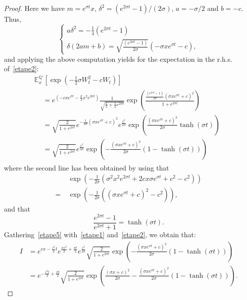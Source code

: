 \documentclass[10pt]{amsart}
\theoremstyle{definition}\newtheorem{defi}[theo]{Definition}\newtheorem{rema}[theo]{Remark}\newtheorem{exam}[theo]{Example}\newtheorem{exem}[theo]{Example}\newtheorem{nota}[theo]{Notation}
\newcommand*\E{\mathbb{E}}
\newcommand{\bbQ}{\mathbb{Q}}
\begin{document}
\begin{proof}
Here we have $m=e^{\sigma t}x$, $\delta^2=(e^{2\sigma t}-1)/(2\sigma)$, $a=-\sigma/2$ and $b=-c$. Thus,
\[
\begin{cases}
a\delta^2=-\frac{1}{4}\left(e^{2\sigma t}-1 \right)\\
\delta(2am+b)=\sqrt{\frac{\left(e^{2\sigma t}-1\right)}{2\sigma}}\left(-\sigma x e^{\sigma t}-c \right),
\end{cases}
\]
and applying the above computation yields for the expectation in the r.h.s. of~\eqref{etape2}:
\begin{multline}\label{etape5}
\E_{x}^{\bbQ'}\left[\exp\left(-\frac{1}{2}\sigma W_{t}^2-c W_{t} \right) \right]\\
\begin{aligned}
&= e^{\left(-cxe^{\sigma t}-\frac{\sigma}{2}x^2e^{2\sigma t}\right)}\frac{1}{\sqrt{\frac{1}{2}+\frac{1}{2}e^{2\sigma t}}}\exp\left(\frac{\frac{\left(e^{2\sigma t}-1\right)}{2\sigma}\left(\sigma x e^{\sigma t}+c \right)^2}{1+e^{2\sigma t}} \right)\\
 &= \sqrt{\frac{2}{1+e^{2\sigma t}}} e^{-\frac{1}{2\sigma} \left(\sigma x e^{\sigma t}+c\right)^2 } e^{\frac{c^2}{2\sigma}}\exp\left(\frac{\left(\sigma x e^{\sigma t}+c\right)^2}{2\sigma}\tanh\left(\sigma t\right)\right)\\
& = \sqrt{\frac{2}{1+e^{2\sigma t}}} e^{\frac{c^2}{2\sigma}}\exp\left(-\frac{\left(\sigma x e^{\sigma t}+c\right)^2}{2\sigma}\left(1-\tanh(\sigma t)\right)\right)
\end{aligned}
\end{multline}
where the second line has been obtained by using that
\begin{align*}
&\exp\left(-\frac{1}{2\sigma}\left(\sigma^2 x^2e^{2\sigma t}+2cx\sigma e^{\sigma t}+c^2-c^2\right)\right)\\
=\; &\exp\left(-\frac{1}{2\sigma}\left(\left(\sigma xe^{\sigma t}+c\right)^2-c^2\right)\right),
\end{align*}
and that
\[
\frac{e^{2\sigma t}-1}{e^{2\sigma t}+1}=\tanh(\sigma t).
\]
Gathering~\eqref{etape5} with~\eqref{etape1} and~\eqref{etape2}, we obtain that:
\begin{align*}
I &=e^{cx-\frac{c^2}{2}t} e^{\frac{\sigma x^2}{2}+\frac{\sigma t}{2}} e^{\frac{c^2}{2\sigma}}\sqrt{\frac{2}{1+e^{2\sigma t}}}\exp\left(-\frac{\left(\sigma xe^{\sigma t}+c \right)^2}{2\sigma}\left(1-\tanh(\sigma t)\right) \right)\\
&=e^{-\frac{c^2t}{2}+\frac{\sigma t}{2}}\sqrt{\frac{2}{1+e^{2\sigma t}}}\exp\left(\frac{(\sigma x+c)^2}{2\sigma}-\frac{\left(\sigma xe^{\sigma t}+c \right)^2}{2\sigma}\left(1-\tanh(\sigma t)\right) \right).

\end{align*}
\end{proof}
\end{document}
